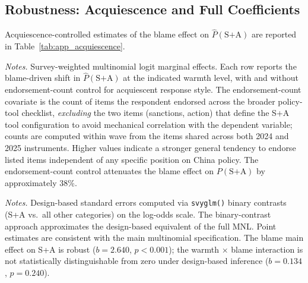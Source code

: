 \documentclass[12pt,letterpaper]{article}
\begin{document}
\subsection{Robustness: Acquiescence and Full Coefficients}

Acquiescence-controlled estimates of the blame effect on $\hat{P}(\text{S+A})$ are reported in Table~\ref{tab:app_acquiescence}.

\begin{table}[htbp]
\centering
\small
\caption{Acquiescence-Adjusted Blame Effects: With and Without Endorsement-Count Control}
\label{tab:app_acquiescence}

\par\vspace{0.5ex}
{\footnotesize\textit{Notes.} Survey-weighted multinomial logit marginal effects. Each row reports the blame-driven shift in $\hat{P}(\text{S+A})$ at the indicated warmth level, with and without endorsement-count control for acquiescent response style. The endorsement-count covariate is the count of items the respondent endorsed across the broader policy-tool checklist, \emph{excluding} the two items (sanctions, action) that define the S+A tool configuration to avoid mechanical correlation with the dependent variable; counts are computed within wave from the items shared across both 2024 and 2025 instruments. Higher values indicate a stronger general tendency to endorse listed items independent of any specific position on China policy. The endorsement-count control attenuates the blame effect on $P(\text{S+A})$ by approximately 38\%.}
\end{table}

\begin{table}[htbp]
\centering
\small
\caption{Design-Based Sensitivity Check: MNL S+A Coefficients (Log-Odds Scale)}
\label{tab:app_design_mnl}

\par\vspace{0.5ex}
{\footnotesize\textit{Notes.} Design-based standard errors computed via \texttt{svyglm()} binary contrasts (S+A vs.\ all other categories) on the log-odds scale. The binary-contrast approach approximates the design-based equivalent of the full MNL. Point estimates are consistent with the main multinomial specification. The blame main effect on S+A is robust ($b = 2.640$, $p < 0.001$); the warmth $\times$ blame interaction is not statistically distinguishable from zero under design-based inference ($b = 0.134$, $p = 0.240$).}
\end{table}
\end{document}
